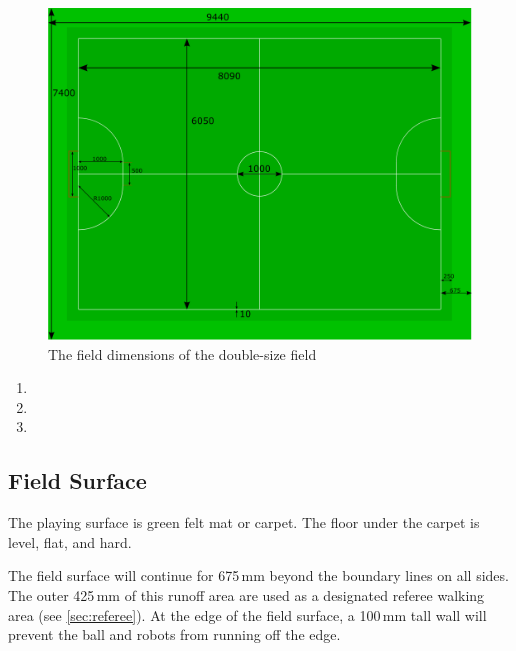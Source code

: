 \begin{figure}[ht] %
  \centering
  \includegraphics[width=0.8\columnwidth]{img/double-size-field.png}
  \caption{The field dimensions of the double-size field}
  \label{fig:double_size_field}
\end{figure}

\begin{enumerate}
\item {}
\item {}
\item {}
\end{enumerate}

\subsection{Field Surface}
The playing surface is green felt mat or carpet.
The floor under the carpet is level, flat, and hard.

The field surface will continue for 675\,mm beyond the boundary lines on all sides.
The outer 425\,mm of this runoff area are used as a designated referee walking area (see \autoref{sec:referee}).
At the edge of the field surface, a 100\,mm tall wall will prevent the ball and robots from running off the edge.

